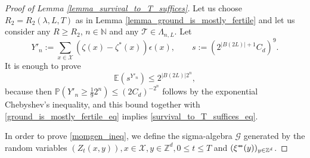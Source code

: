 \documentclass[a4paper,12pt]{article}
\newcommand{\sstar}{* \hspace{-.05cm} *}
\begin{document}
\begin{proof}[Proof of Lemma \ref{lemma_survival_to_T_suffices}]
Let us choose $R_2=R_2(\lambda, L, T)$ as in Lemma \ref{lemma_ground_is_mostly_fertile} and let us consider any $R \geq R_2$,
$n \in \mathbb{N}$ and any $\mathcal{T} \in \Lambda_{n,L}$. Let
\begin{equation}\label{Y_n_prome_def}
  Y'_n:=  \sum_{x \in \mathcal{X} } \left( \zeta(x) - \zeta^{*}(x) \right)\epsilon(x), \qquad s:=\left(2^{|B(2L)|+1} C_d \right)^9.
\end{equation}
  It is enough to prove
 \begin{equation}\label{momgen_ineq}
 \mathbb{E} \left( s^{Y'_n} \right)  \leq 2^{ |B(2L)| 2^n},
 \end{equation}
  because then  $\mathbb{P}\left( Y'_n \geq \frac{1}{9} 2^n  \right) \leq  \left( 2 C_d  \right)^{-2^n}$ follows by the exponential Chebyshev's inequality, and this bound together with \eqref{ground_is_mostly_fertile_eq} implies  \eqref{survival_to_T_suffices_eq}.




In order to prove \eqref{momgen_ineq},
we  define the sigma-algebra $\mathcal{G}$ generated by the random variables $(Z_t(x,y)), x \in \mathcal{X}, y \in \mathbb{Z}^d, 0 \leq t \leq T$ and $(\xi^{\sstar}(y) )_{y \in \mathbb{Z}^d}$.


\end{proof}
\end{document}

